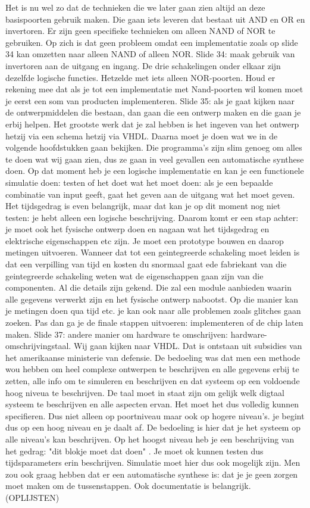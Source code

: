 \documentclass[10pt,a4paper]{book}
\begin{document}
Het is nu wel zo dat de technieken die we later gaan zien altijd an deze basispoorten gebruik maken. Die gaan iets leveren dat bestaat uit AND en OR en invertoren. Er zijn geen specifieke technieken om alleen NAND of NOR te gebruiken. Op zich is dat geen probleem omdat een implementatie zoals op slide 34 kan omzetten naar alleen NAND of alleen NOR. 
Slide 34: maak gebruik van invertoren aan de uitgang en ingang. De drie schakelingen onder elkaar zijn dezelfde logische functies. Hetzelde met iets alleen NOR-poorten.
Houd er rekening mee dat als je tot een implementatie met Nand-poorten wil komen moet je eerst een som van producten implementeren. 
Slide 35: als je gaat kijken naar de ontwerpmiddelen die bestaan, dan gaan die een ontwerp maken en die gaan je erbij helpen. Het grootste werk dat je zal hebben is het ingeven van het ontwerp hetzij via een schema hetzij via VHDL. Daarna moet je doen wat we in de volgende hoofdstukken gaan bekijken. Die programma's zijn slim genoeg om alles te doen wat wij gaan zien, dus ze gaan in veel gevallen een automatische synthese doen. Op dat moment heb je een logische implementatie en kan je een functionele simulatie doen: testen of het doet wat het moet doen: als je een bepaalde combinatie van input geeft, gaat het geven aan de uitgang wat het moet geven.
Het tijdsgedrag is even belangrijk, maar dat kan je op dit moment nog niet testen: je hebt alleen een logische beschrijving. Daarom komt er een stap achter: je moet ook het fysische ontwerp doen en nagaan wat het tijdsgedrag en elektrische eigenschappen etc zijn. Je moet een prototype bouwen en daarop metingen uitvoeren. Wanneer dat tot een geintegreerde schakeling moet leiden is dat een verpilling van tijd en kosten du snormaal gaat ede fabriekant van die geintegreerde schakeling weten wat de eigenschappen gaan zijn van die componenten. Al die details zijn gekend. Die zal een module aanbieden waarin alle gegevens verwerkt zijn en het fysische ontwerp nabootst. Op die manier kan je metingen doen qua tijd etc. je kan ook naar alle problemen zoals glitches gaan zoeken. Pas dan ga je de finale stappen uitvoeren: implementeren of de chip laten maken. 
Slide 37: andere manier om hardware te omschrijven: hardware-omschrijvingstaal. Wij gaan kijken naar VHDL. Dat is ontstaan uit subsidies van het amerikaanse ministerie van defensie. De bedoeling was dat men een methode wou hebben om heel complexe ontwerpen te beschrijven en alle gegevens erbij te zetten, alle info om te simuleren en beschrijven en dat systeem op een voldoende hoog niveua te beschrijven.
De taal moet in staat zijn om gelijk welk digtaal systeem te beschrijven en alle aspecten ervan. Het moet het dus volledig kunnen specifieren. Dus niet alleen op poortniveau maar ook op hogere niveau's. je begint dus op een hoog niveau en je daalt af. De bedoeling is hier dat je het systeem op alle niveau's kan beschrijven. Op het hoogst niveau heb je een beschrijving van het gedrag: "dit blokje moet dat doen" . Je moet ok kunnen testen dus tijdsparameters erin beschrijven. Simulatie moet hier dus ook mogelijk zijn. Men zou ook graag hebben dat er een automatische synthese is: dat je je geen zorgen moet maken om de tussenstappen. Ook documentatie is belangrijk. (OPLIJSTEN)
\end{document}
